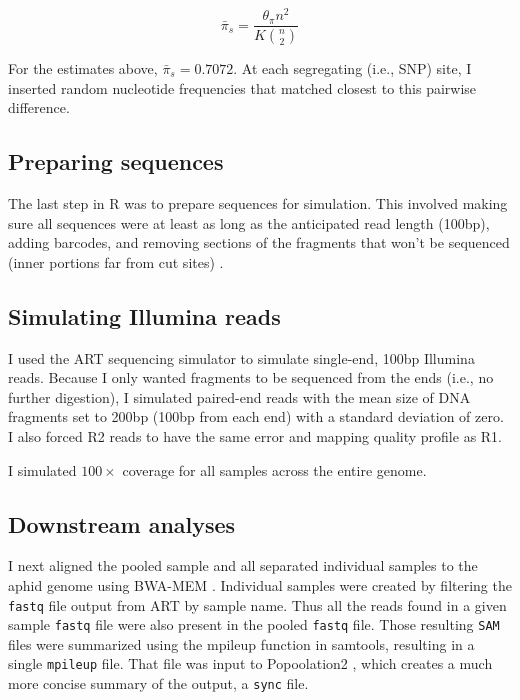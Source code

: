 \begin{equation} \label{eq:barpi_s}
    \bar{\pi}_{s} = \frac{\theta_\pi n^2}{K {n \choose 2}}
\end{equation}

For the estimates above, $\bar{\pi}_s = 0.7072$. At each segregating (i.e., SNP) site,
I inserted random nucleotide frequencies that matched closest to this pairwise
difference.

\subsection{Preparing sequences}

The last step in R was to prepare sequences for simulation.
This involved making sure all sequences were at least as long as the anticipated read 
length (100bp), adding barcodes, and removing sections of the fragments that won't be 
sequenced (inner portions far from cut sites) \citep{Elshire:2011gn,Davey:2011ip}.

\subsection{Simulating Illumina reads}

I used the ART sequencing simulator \citep{Huang:2012kq} to simulate single-end, 100bp
Illumina reads.
Because I only wanted fragments to be sequenced from the ends (i.e., no further 
digestion), I simulated paired-end reads with the mean size of DNA fragments set to
200bp (100bp from each end) with a standard deviation of zero.
I also forced R2 reads to have the same error and mapping quality profile as R1.

I simulated $100\times$ coverage for all samples across the entire genome.


\subsection{Downstream analyses}

I next aligned the pooled sample and all separated individual samples to the aphid genome
using BWA-MEM \citep{Li:2013wn}. 
Individual samples were created by filtering the \texttt{fastq} file output from ART
by sample name. Thus all the reads found in a given sample \texttt{fastq} file were also
present in the pooled \texttt{fastq} file.
Those resulting \texttt{SAM} files were summarized using the mpileup function in 
samtools, resulting in a single \texttt{mpileup} file.
That file was input to Popoolation2 \citep{Kofler:2011ds}, which creates a much more 
concise summary of the output, a \texttt{sync} file.

